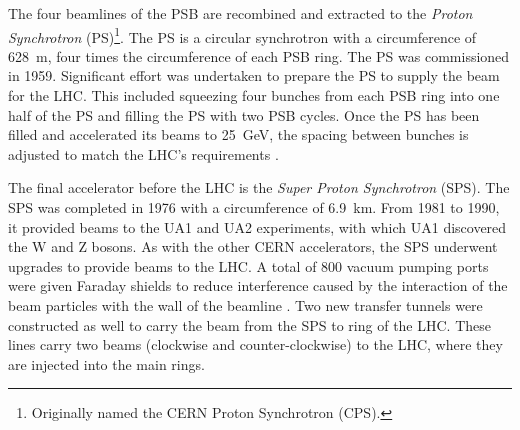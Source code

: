 The four beamlines of the PSB are recombined and extracted to the \emph{Proton Synchrotron} (PS)\footnote{Originally named the CERN Proton Synchrotron (CPS).}.
The PS is a circular synchrotron with a circumference of 628~m, four times the circumference of each PSB ring. 
The PS was commissioned in 1959.
Significant effort was undertaken to prepare the PS to supply the beam for the LHC.
This included squeezing four bunches from each PSB ring into one half of the PS and filling the PS with two PSB cycles.
Once the PS has been filled and accelerated its beams to 25~GeV, the spacing between bunches is adjusted to match the LHC's requirements \cite{schindl}.

The final accelerator before the LHC is the \emph{Super Proton Synchrotron} (SPS).
The SPS was completed in 1976 with a circumference of 6.9~km.
From 1981 to 1990, it provided beams to the UA1 and UA2 experiments, with which UA1 discovered the W and Z bosons.
As with the other CERN accelerators, the SPS underwent upgrades to provide beams to the LHC.
A total of 800 vacuum pumping ports were given Faraday shields to reduce interference caused by the interaction of the beam particles with the wall of the beamline \cite{schindl}.
Two new transfer tunnels were constructed as well to carry the beam from the SPS to ring of the LHC.
These lines carry two beams (clockwise and counter-clockwise) to the LHC, where they are injected into the main rings.
